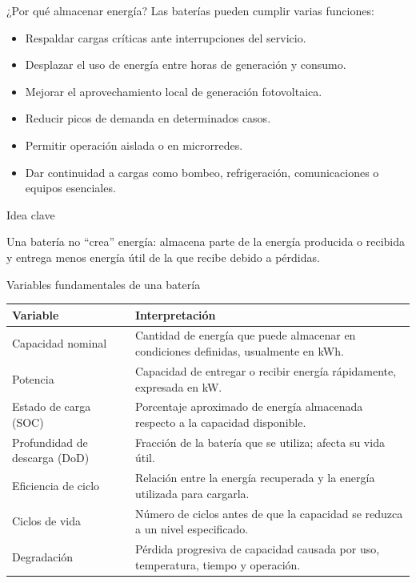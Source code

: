 \documentclass[aspectratio=169,10pt]{beamer}
\newcommand{\idea}[1]{
\begin{block}{Idea clave}
#1
\end{block}
}
\begin{document}
\begin{frame}{¿Por qué almacenar energía?}
Las baterías pueden cumplir varias funciones:

\begin{itemize}
    \item Respaldar cargas críticas ante interrupciones del servicio.
    \item Desplazar el uso de energía entre horas de generación y consumo.
    \item Mejorar el aprovechamiento local de generación fotovoltaica.
    \item Reducir picos de demanda en determinados casos.
    \item Permitir operación aislada o en microrredes.
    \item Dar continuidad a cargas como bombeo, refrigeración, comunicaciones o equipos esenciales.
\end{itemize}

\idea{
Una batería no ``crea'' energía: almacena parte de la energía producida o recibida y entrega menos energía útil de la que recibe debido a pérdidas.
}
\end{frame}

\begin{frame}{Variables fundamentales de una batería}
\begin{table}
\centering
\small
\begin{tabular}{p{} p{}}
\toprule
\textbf{Variable} & \textbf{Interpretación} \\
\midrule
Capacidad nominal & Cantidad de energía que puede almacenar en condiciones definidas, usualmente en kWh. \\
\addlinespace
Potencia & Capacidad de entregar o recibir energía rápidamente, expresada en kW. \\
\addlinespace
Estado de carga (SOC) & Porcentaje aproximado de energía almacenada respecto a la capacidad disponible. \\
\addlinespace
Profundidad de descarga (DoD) & Fracción de la batería que se utiliza; afecta su vida útil. \\
\addlinespace
Eficiencia de ciclo & Relación entre la energía recuperada y la energía utilizada para cargarla. \\
\addlinespace
Ciclos de vida & Número de ciclos antes de que la capacidad se reduzca a un nivel especificado. \\
\addlinespace
Degradación & Pérdida progresiva de capacidad causada por uso, temperatura, tiempo y operación. \\
\bottomrule
\end{tabular}
\end{table}
\end{frame}
\end{document}
